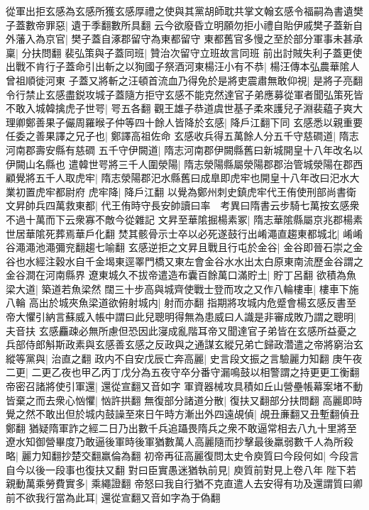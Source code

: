 從軍出拒玄感為玄感所獲玄感厚禮之使與其黨胡師耽共掌文翰玄感令福嗣為書遺樊子蓋數帝罪惡|{
	遺于季翻數所具翻}
云今欲廢昏立明願勿拒小禮自貽伊戚樊子蓋新自外藩入為京官|{
	樊子蓋自涿郡留守為東都留守}
東都舊官多慢之至於部分軍事未甚承稟|{
	分扶問翻}
裴弘策與子蓋同班|{
	贊治次留守立班故言同班}
前出討賊失利子蓋更使出戰不肯行子蓋命引出斬之以狥國子祭酒河東楊汪小有不恭|{
	楊汪傳本弘農華隂人曾祖順徙河東}
子蓋又將斬之汪頓首流血乃得免於是將吏震肅無敢仰視|{
	是將子亮翻}
令行禁止玄感盡鋭攻城子蓋隨方拒守玄感不能克然達官子弟應募從軍者聞弘策死皆不敢入城韓擒虎子世咢|{
	咢五各翻}
觀王雄子恭道虞世基子柔來護兒子淵裴藴子爽大理卿鄭善果子儼周羅㬋子仲等四十餘人皆降於玄感|{
	降戶江翻下同}
玄感悉以親重要任委之善果譯之兄子也|{
	鄭譯高祖佐命}
玄感收兵得五萬餘人分五千守慈磵道|{
	隋志河南郡壽安縣有慈磵}
五千守伊闕道|{
	隋志河南郡伊闕縣舊曰新城開皇十八年改名以伊闕山名縣也}
遣韓世咢將三千人圍滎陽|{
	隋志滎陽縣屬滎陽郡郡治管城滎陽在郡西}
顧覺將五千人取虎牢|{
	隋志滎陽郡汜水縣舊曰成臯即虎牢也開皇十八年改曰汜水大業初置虎牢都尉府}
虎牢降|{
	降戶江翻}
以覺為鄭州刺史鎮虎牢代王侑使刑部尚書衛文昇帥兵四萬救東都|{
	代王侑時守長安帥讀曰率　考異曰隋書云步騎七萬按玄感衆不過十萬而下云衆寡不敵今從雜記}
文昇至華隂掘楊素冢|{
	隋志華隂縣屬京兆郡楊素世居華隂死葬焉華戶化翻}
焚其骸骨示士卒以必死遂鼓行出崤澠直趨東都城北|{
	崤崤谷澠澠池澠彌兖翻趨七喻翻}
玄感逆拒之文昇且戰且行屯於金谷|{
	金谷即晉石崇之金谷也水經注穀水自千金堨東逕睪門橋又東左會金谷水水出太白原東南流歷金谷謂之金谷澗在河南縣界}
遼東城久不拔帝遣造布囊百餘萬口滿貯土|{
	貯丁呂翻}
欲積為魚梁大道|{
	築道若魚梁然}
闊三十步高與城齊使戰士登而攻之又作八輪樓車|{
	樓車下施八輪}
高出於城夾魚梁道欲俯射城内|{
	射而亦翻}
指期將攻城内危蹙會楊玄感反書至帝大懼引納言蘇威入帳中謂曰此兒聰明得無為患威曰人識是非審成敗乃謂之聰明|{
	夫音扶}
玄感麤疎必無所慮但恐因此寖成亂階耳帝又聞達官子弟皆在玄感所益憂之兵部侍郎斛斯政素與玄感善玄感之反政與之通謀玄縱兄弟亡歸政濳遣之帝將窮治玄縱等黨與|{
	治直之翻}
政内不自安戊辰亡奔高麗|{
	史言段文振之言驗麗力知翻}
庚午夜二更|{
	二更乙夜也甲乙丙丁戊分為五夜守卒分番守漏鳴鼓以相警謂之持更更工衡翻}
帝密召諸將使引軍還|{
	還從宣翻又音如字}
軍資器械攻具積如丘山營壘帳幕案堵不動皆棄之而去衆心忷懼|{
	忷許拱翻}
無復部分諸道分散|{
	復扶又翻部分扶問翻}
高麗即時覺之然不敢出但於城内鼓譟至來日午時方漸出外四遠覘偵|{
	覘丑亷翻又丑塹翻偵丑鄭翻}
猶疑隋軍詐之經二日乃出數千兵追躡畏隋兵之衆不敢逼常相去八九十里將至遼水知御營畢度乃敢逼後軍時後軍猶數萬人高麗隨而抄擊最後羸弱數千人為所殺略|{
	麗力知翻抄楚交翻羸倫為翻}
初帝再征高麗復問太史令庾質曰今段何如|{
	今段言自今以後一段事也復扶又翻}
對曰臣實愚迷猶執前見|{
	庾質前對見上卷八年}
陛下若親動萬乘勞費實多|{
	乘繩證翻}
帝怒曰我自行猶不克直遣人去安得有功及還謂質曰卿前不欲我行當為此耳|{
	還從宣翻又音如字為于偽翻}
